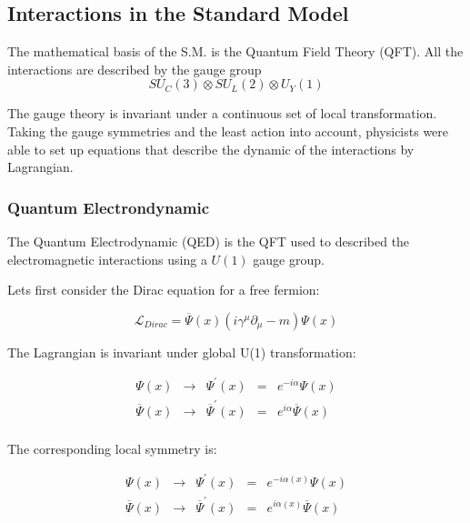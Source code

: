     \subsection{Interactions in the Standard Model}

	The mathematical basis of the S.M. is the Quantum Field Theory (QFT). All the interactions are described by the gauge group 
    \begin{equation}
    	SU_C(3) \otimes SU_L(2) \otimes U_Y(1)
	\end{equation}
    
    The gauge theory is invariant under a continuous set of local transformation.
    Taking the gauge symmetries and the least action into account, physicists were able to set up equations that describe the dynamic of the interactions by Lagrangian.
    
      \subsubsection{Quantum Electrondynamic}

      The Quantum Electrodynamic (QED) is the QFT used to described the electromagnetic interactions using a $U(1)$ gauge group.
     
      Lets first consider the Dirac equation for a free fermion:
      
      \begin{equation}
        \mathcal{L}_{Dirac} = \overline{\Psi}\left(x\right) \left(i \gamma^{\mu}\partial_{\mu} - m \right) \Psi\left(x\right)
      \end{equation}

      The Lagrangian is invariant under global U(1) transformation:

      \begin{equation}
            \begin{array}{rrccr}
             \Psi \left(x \right) & \rightarrow & \Psi^{'} \left(x \right)  & = & e^{-i\alpha} \Psi\left(x\right) \\
             \overline{\Psi}\left(x\right) & \rightarrow & \overline{\Psi}^{'}\left(x\right) & = & e^{i\alpha}  \overline{\Psi}\left(x\right) \\
            \end{array}
      \end{equation}

      The corresponding local symmetry is:

      \begin{equation}
            \begin{array}{rcccr}
             \Psi\left(x\right) & \rightarrow & \Psi^{'} \left(x \right) & = & e^{-i\alpha(x)} \Psi\left(x\right) \\
             \overline{\Psi}\left(x\right) & \rightarrow & \overline{\Psi}^{'}\left(x\right) & = & e^{i\alpha(x)}  \overline{\Psi}\left(x\right) \\
            \end{array}
      \end{equation}

